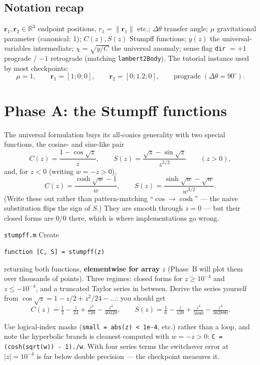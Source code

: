 \documentclass[11pt,letterpaper]{article}
\newcommand{\R}{\mathbb{R}}
\newcommand{\rvec}{\mathbf{r}}
\newcommand{\dth}{\Delta\theta}
\begin{document}
\subsection{Notation recap}

$\rvec_1, \rvec_2 \in \R^3$ endpoint positions, $r_1 = \|\rvec_1\|$ etc.;
$\dth$ transfer angle; $\mu$ gravitational parameter (canonical: 1);
$C(z), S(z)$ Stumpff functions; $y(z)$ the universal-variables intermediate;
$\chi = \sqrt{y/C}$ the universal anomaly; sense flag \texttt{dir} $= +1$
prograde / $-1$ retrograde (matching \texttt{lambert2Body}). The tutorial
instance used by most checkpoints:
\[
  \mu = 1,\qquad \rvec_1 = [1;0;0],\qquad \rvec_2 = [0;1.2;0],\qquad
  \text{prograde} \;(\dth = 90^\circ).
\]

\section{Phase A: the Stumpff functions}

The universal formulation buys its all-conics generality with two special
functions, the cosine- and sine-like pair
\[
  C(z) = \frac{1 - \cos\sqrt z}{z},\qquad
  S(z) = \frac{\sqrt z - \sin\sqrt z}{z^{3/2}} \qquad (z > 0),
\]
and, for $z < 0$ (writing $w = -z > 0$),
\[
  C(z) = \frac{\cosh\sqrt w - 1}{w},\qquad
  S(z) = \frac{\sinh\sqrt w - \sqrt w}{w^{3/2}}.
\]
(Write these out rather than pattern-matching ``$\cos\to\cosh$'' --- the
naive substitution flips the sign of $S$.) They are smooth through $z = 0$
--- but their closed forms are $0/0$ there, which is where implementations
go wrong.

\begin{exercise}{\texttt{stumpff.m}}
Create
\begin{verbatim}
function [C, S] = stumpff(z)
\end{verbatim}
returning both functions, \textbf{elementwise for array} $z$ (Phase~B will
plot them over thousands of points). Three regimes: closed forms for
$z \ge 10^{-4}$ and $z \le -10^{-4}$, and a truncated Taylor series in
between. Derive the series yourself from
$\cos\sqrt z = 1 - z/2 + z^2/24 - \dots$: you should get
\[
  C(z) = \tfrac12 - \tfrac{z}{24} + \tfrac{z^2}{720} - \tfrac{z^3}{40320},
  \qquad
  S(z) = \tfrac16 - \tfrac{z}{120} + \tfrac{z^2}{5040} - \tfrac{z^3}{362880}.
\]
\end{exercise}

\begin{hint}
Use logical-index masks (\texttt{small = abs(z) < 1e-4}, etc.) rather than
a loop, and note the hyperbolic branch is cleanest computed with
$w = -z > 0$: \texttt{C = (cosh(sqrt(w)) - 1)./w}. With four series terms
the switchover error at $|z| = 10^{-4}$ is far below double precision ---
the checkpoint measures it.
\end{hint}
\end{document}
